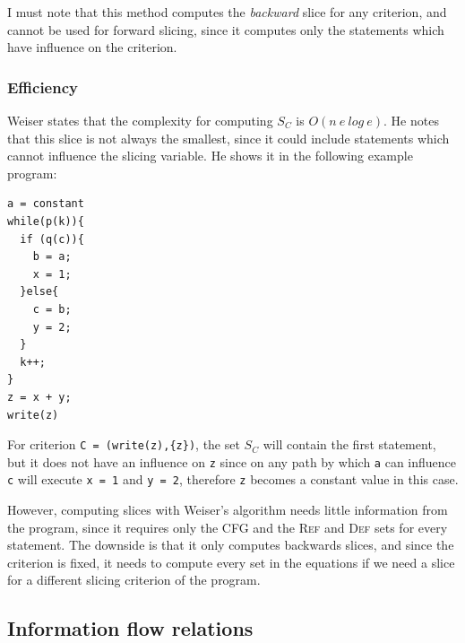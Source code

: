 \documentclass[oneside,12pt,a4paper]{book}
\begin{document}
I must note that this method computes the \textit{backward} slice for any criterion, and cannot be used for forward slicing, since it computes only the statements which have influence on the criterion.

\subsubsection{Efficiency}
Weiser states that the complexity for computing $S_C$ is $O(n\ e\ log\ e)$. He notes that this slice is not always the smallest, since it could include statements which cannot influence the slicing variable. He shows it in the following example program:
\begin{lstlisting}
a = constant
while(p(k)){
  if (q(c)){
    b = a;
    x = 1;
  }else{
  	c = b;
  	y = 2;
  }
  k++;
}
z = x + y;
write(z)
\end{lstlisting}

For criterion \texttt{C = (write(z),\{z\})}, the set $S_C$ will contain the first statement, but it does not have an influence on \texttt{z} since on any path by which \texttt{a} can influence \texttt{c} will execute \texttt{x = 1} and \texttt{y = 2}, therefore \texttt{z} becomes a constant value in this case. 

However, computing slices with Weiser's algorithm needs little information from the program, since it requires only the CFG and the \textsc{Ref} and \textsc{Def} sets for every statement.
The downside is that it only computes backwards slices, and since the criterion is fixed, it needs to compute every set in the equations if we need a slice for a different slicing criterion of the program.

\subsection{Information flow relations}
\end{document}
